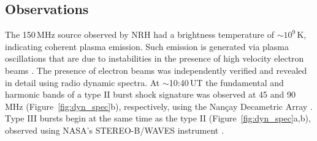\subsection{Observations}
The 150\,MHz source observed by NRH had a brightness temperature of $\sim$$10^9$\,K, indicating coherent plasma emission. Such emission is generated via plasma oscillations that are due to instabilities in the presence of high velocity electron beams \citep{dulk1985}. The presence of electron beams was independently verified and revealed in detail using radio dynamic spectra. At $\sim$10:40\,UT the fundamental and harmonic bands of a type II burst shock signature was observed at 45 and 90\,MHz (Figure~\ref{fig:dyn_spec}b), respectively, using the Nan\c{c}ay Decametric Array \citep[NDA;][]{boischot1980}. Type III bursts begin at the same time as the type II (Figure~\ref{fig:dyn_spec}a,b), observed using NASA's STEREO-B/WAVES instrument \citep{bougeret2008}. 


